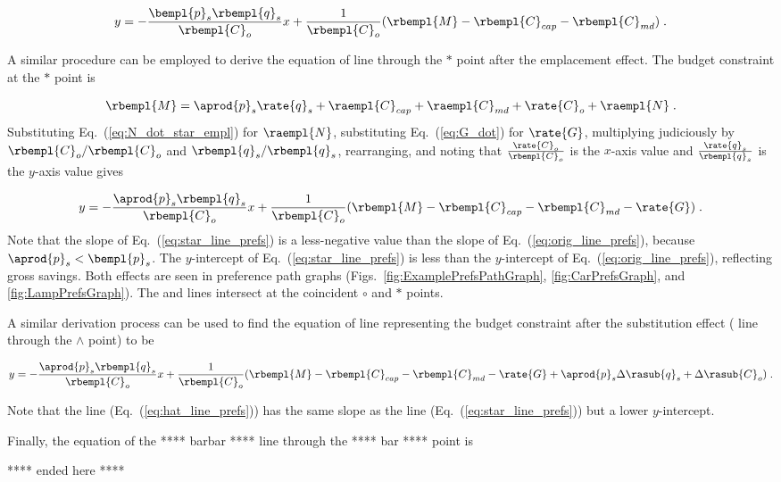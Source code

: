 \begin{equation} \label{eq:orig_line_prefs}
  y = - \frac{\bempl{p}_s \rbempl{q}_s}{\rbempl{C}_o} x
         + \frac{1}{\rbempl{C}_o} (\rbempl{M} - \rbempl{C}_{cap} - \rbempl{C}_{md}) \; .
\end{equation}

A similar procedure can be employed to derive the equation of 
\starstar{} line through the $*$ point
after the emplacement effect.
The budget constraint at the $*$ point is

\begin{equation}
  \rbempl{M} = \aprod{p}_s \rate{q}_s + \raempl{C}_{cap} + \raempl{C}_{md} + \rate{C}_o + \raempl{N} \; .
\end{equation}
%
Substituting Eq.~(\ref{eq:N_dot_star_empl}) for $\raempl{N}$,
substituting Eq.~(\ref{eq:G_dot}) for $\rate{G}$,
multiplying judiciously by $\rbempl{C}_o/\rbempl{C}_o$ and $\rbempl{q}_s/\rbempl{q}_s$, 
rearranging, and noting that 
$\frac{\rate{C}_o}{\rbempl{C}_o}$ is the $x$-axis value and 
$\frac{\rate{q}_s}{\rbempl{q}_s}$ is the $y$-axis value gives

\begin{equation} \label{eq:star_line_prefs}
  y = - \frac{\aprod{p}_s \rbempl{q}_s}{\rbempl{C}_o} x
         + \frac{1}{\rbempl{C}_o} (\rbempl{M} - \rbempl{C}_{cap} - \rbempl{C}_{md} - \rate{G}) \; .
\end{equation}
%
Note that the slope of Eq.~(\ref{eq:star_line_prefs}) is a less-negative value
than the slope of Eq.~(\ref{eq:orig_line_prefs}), 
because $\aprod{p}_s < \bempl{p}_s$.
The $y$-intercept of Eq.~(\ref{eq:star_line_prefs}) is less than the 
$y$-intercept of Eq.~(\ref{eq:orig_line_prefs}),
reflecting gross savings.
Both effects are seen in
preference path graphs 
(Figs.~\ref{fig:ExamplePrefsPathGraph}, \ref{fig:CarPrefsGraph}, and \ref{fig:LampPrefsGraph}).
The \circcirc{} and \starstar{} lines intersect at the coincident $\circ$ and $*$ points.

A similar derivation process can be used to find the equation of 
line representing the budget constraint
after the substitution effect (\hathat{} line through the $\wedge$ point) to be

\begin{equation} \label{eq:hat_line_prefs}
  y = - \frac{\aprod{p}_s \rbempl{q}_s}{\rbempl{C}_o} x
         + \frac{1}{\rbempl{C}_o} (\rbempl{M} - \rbempl{C}_{cap} - \rbempl{C}_{md} 
                                   - \rate{G} + \aprod{p}_s \Delta \rasub{q}_s + \Delta \rasub{C}_o) \; .
\end{equation}

Note that the \hathat{} line (Eq.~(\ref{eq:hat_line_prefs})) has the same slope as 
the \starstar{} line (Eq.~(\ref{eq:star_line_prefs}))
but a lower $y$-intercept.

Finally, the equation of the **** barbar **** line through the **** bar **** point is

**** ended here ****